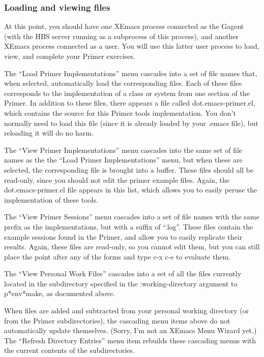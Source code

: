 \subsubsection{Loading and viewing files}

At this point, you should have one XEmacs process connected as the Gagent
(with the HBS server running as a subprocess of this process), and another
XEmacs process connected as a user.   You will use this latter user process to 
load, view, and complete your Primer exercises.  

The ``Load Primer Implementations'' menu cascades into a set of file names 
that, when selected, automatically load the corresponding files.  Each of
these files corresponds to the implementation of a class or system from
one section of the Primer.  In addition to these files, there appears a file
called dot.emacs-primer.el, which contains the source for this Primer tools
implementation.  You don't normally need to load this file (since it is 
already loaded by your .emacs file), but reloading it will do no harm. 

The ``View Primer Implementations'' menu cascades into the same set of file
names as the the ``Load Primer Implementations'' menu, but when these are
selected, the corresponding file is brought into a buffer.  These files
should all be read-only, since you should not edit the primer example
files.  Again, the dot.emacs-primer.el file appears in this list, which
allows you to easily peruse the implementation of these tools. 

The ``View Primer Sessions'' menu cascades into a set of file
names with the same prefix as the implementations, but with a suffix of
``.log''.  These files contain the example sessions found in the Primer, 
and allow you to easily replicate their results.  Again, these files are
read-only, so you cannot edit them, but you can still place the point
after any of the forms and type c-x c-e to evaluate them.  

The ``View Personal Work Files'' cascades into a set of all
the files currently located in the subdirectory specified in the
:working-directory argument to p*env*make, as documented above.  

When files are added and subtracted from your personal working directory (or
from the Primer subdirectories), the cascading menu items above do not
automatically update themselves.  (Sorry, I'm not an XEmacs Menu Wizard
yet.)  The ``Refresh Directory Entries'' menu item rebuilds these 
cascading menus with the current contents of the subdirectories. 



